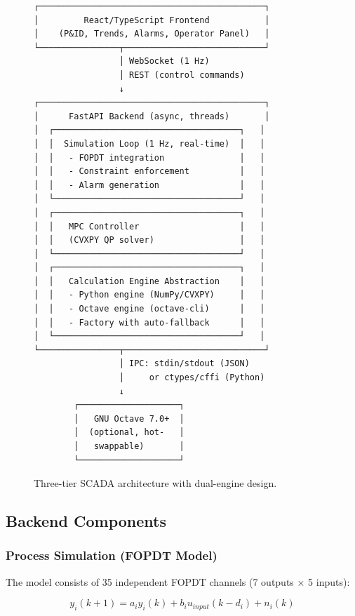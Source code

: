 \documentclass[conference]{IEEEtran}
\begin{document}
\begin{figure}[h]
\centering
\small
\begin{verbatim}
┌─────────────────────────────────────────────┐
│         React/TypeScript Frontend           │
│    (P&ID, Trends, Alarms, Operator Panel)   │
└────────────────┬────────────────────────────┘
                 │ WebSocket (1 Hz)
                 │ REST (control commands)
                 ↓
┌─────────────────────────────────────────────┐
│      FastAPI Backend (async, threads)       │
│  ┌─────────────────────────────────────┐   │
│  │  Simulation Loop (1 Hz, real-time)  │   │
│  │   - FOPDT integration               │   │
│  │   - Constraint enforcement          │   │
│  │   - Alarm generation                │   │
│  └─────────────────────────────────────┘   │
│  ┌─────────────────────────────────────┐   │
│  │   MPC Controller                    │   │
│  │   (CVXPY QP solver)                 │   │
│  └─────────────────────────────────────┘   │
│  ┌─────────────────────────────────────┐   │
│  │   Calculation Engine Abstraction    │   │
│  │   - Python engine (NumPy/CVXPY)     │   │
│  │   - Octave engine (octave-cli)      │   │
│  │   - Factory with auto-fallback      │   │
│  └─────────────────────────────────────┘   │
└────────────────┬────────────────────────────┘
                 │ IPC: stdin/stdout (JSON)
                 │     or ctypes/cffi (Python)
                 ↓
        ┌────────────────────┐
        │   GNU Octave 7.0+  │
        │  (optional, hot-   │
        │   swappable)       │
        └────────────────────┘
\end{verbatim}
\caption{Three-tier SCADA architecture with dual-engine design.}
\label{fig:arch}
\end{figure}

\subsection{Backend Components}

\subsubsection{Process Simulation (FOPDT Model)}

The model consists of 35 independent FOPDT channels (7 outputs × 5 inputs):

\begin{equation}
y_i(k+1) = a_i y_i(k) + b_i u_{input}(k-d_i) + n_i(k)
\end{equation}
\end{document}
